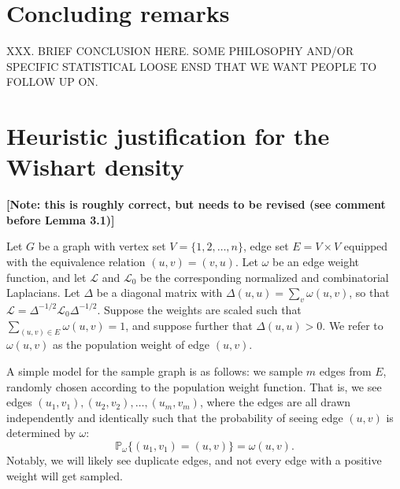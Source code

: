 \documentclass[12pt]{article}
\newcommand{\prob}{\mathbb{P}}
\theoremstyle{plain}
\begin{document}
\section{Concluding remarks}
\label{sxn:conc}

XXX.  BRIEF CONCLUSION HERE.  SOME PHILOSOPHY AND/OR SPECIFIC STATISTICAL LOOSE ENSD THAT WE WANT PEOPLE TO FOLLOW UP ON.




%



\newpage
\appendix

\section{Heuristic justification for the Wishart density}
\label{sxn:justification}

\textbf{[Note: this is roughly correct, but needs to be revised (see
  comment before Lemma 3.1)]}

Let $G$ be a graph with vertex set $V = \{ 1, 2, \dotsc, n \}$, edge
set $E = V \times V$ equipped with the equivalence relation
$(u,v) = (v,u)$.  Let $\omega$ be an edge weight function, and let
$\mathcal{L}$ and $\mathcal{L}_0$ be the corresponding normalized and
combinatorial Laplacians.  Let $\Delta$ be a diagonal matrix with
$\Delta(u,u) = \sum_{v} \omega(u,v)$, so that
$\mathcal{L} = \Delta^{-1/2} \mathcal{L}_0 \Delta^{-1/2}$.  Suppose
the weights are scaled such that $\sum_{(u,v) \in E} \omega(u,v) = 1$,
and suppose further that $\Delta(u,u) > 0$.
We refer to $\omega(u,v)$ as the population weight of edge $(u,v)$.

A simple model for the sample graph is as follows: we sample $m$ edges
from $E$, randomly chosen according to the population weight function.
That is, we see edges $(u_1, v_1), (u_2, v_2), \dotsc, (u_m, v_m)$,
where the edges are all drawn independently and identically such that
the probability of seeing edge $(u,v)$ is determined by $\omega$:
\[
  \prob_\omega\{ (u_1, v_1) = (u,v) \} = \omega(u,v).
\]
Notably, we will likely see duplicate edges, and not every edge with a
positive weight will get sampled.
\end{document}
